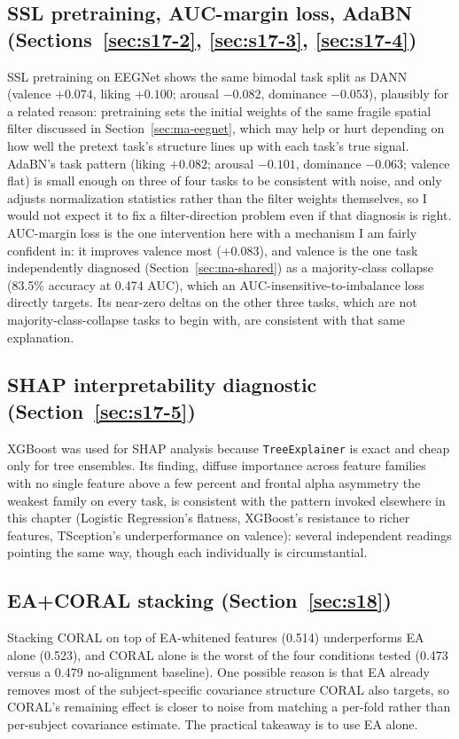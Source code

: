 \documentclass[11pt]{report}
\begin{document}
\subsection{SSL pretraining, AUC-margin loss, AdaBN (Sections~\ref{sec:s17-2},
\ref{sec:s17-3}, \ref{sec:s17-4})}
SSL pretraining on EEGNet shows the same bimodal task split as DANN
(valence $+0.074$, liking $+0.100$; arousal $-0.082$, dominance $-0.053$),
plausibly for a related reason: pretraining sets the initial weights of the
same fragile spatial filter discussed in Section~\ref{sec:ma-eegnet}, which
may help or hurt depending on how well the pretext task's structure lines
up with each task's true signal. AdaBN's task pattern (liking $+0.082$;
arousal $-0.101$, dominance $-0.063$; valence flat) is small enough on
three of four tasks to be consistent with noise, and only adjusts
normalization statistics rather than the filter weights themselves, so I
would not expect it to fix a filter-direction problem even if that
diagnosis is right. AUC-margin loss is the one intervention here with a
mechanism I am fairly confident in: it improves valence most ($+0.083$),
and valence is the one task independently diagnosed (Section~\ref{sec:ma-shared})
as a majority-class collapse (83.5\% accuracy at 0.474 AUC), which an
AUC-insensitive-to-imbalance loss directly targets. Its near-zero deltas on
the other three tasks, which are not majority-class-collapse tasks to begin
with, are consistent with that same explanation.

\subsection{SHAP interpretability diagnostic (Section~\ref{sec:s17-5})}
XGBoost was used for SHAP analysis because \texttt{TreeExplainer} is exact
and cheap only for tree ensembles. Its finding, diffuse importance across
feature families with no single feature above a few percent and frontal
alpha asymmetry the weakest family on every task, is consistent with the
pattern invoked elsewhere in this chapter (Logistic Regression's flatness,
XGBoost's resistance to richer features, TSception's underperformance on
valence): several independent readings pointing the same way, though each
individually is circumstantial.

\subsection{EA+CORAL stacking (Section~\ref{sec:s18})}
Stacking CORAL on top of EA-whitened features (0.514) underperforms EA
alone (0.523), and CORAL alone is the worst of the four conditions tested
(0.473 versus a 0.479 no-alignment baseline). One possible reason is that
EA already removes most of the subject-specific covariance structure CORAL
also targets, so CORAL's remaining effect is closer to noise from matching
a per-fold rather than per-subject covariance estimate. The practical
takeaway is to use EA alone.
\end{document}
